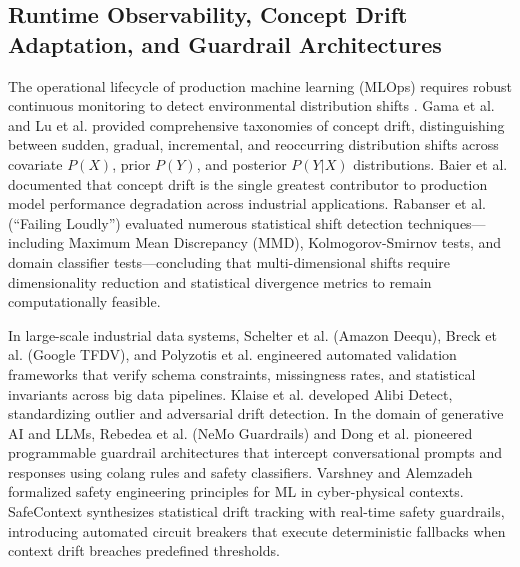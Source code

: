 \documentclass[journal]{IEEEtran}
\begin{document}
\subsection{Runtime Observability, Concept Drift Adaptation, and Guardrail Architectures}
The operational lifecycle of production machine learning (MLOps) requires robust continuous monitoring to detect environmental distribution shifts \cite{gama2014survey, lu2018learning, polyzotis2018data}. Gama et al. \cite{gama2014survey} and Lu et al. \cite{lu2018learning} provided comprehensive taxonomies of concept drift, distinguishing between sudden, gradual, incremental, and reoccurring distribution shifts across covariate $P(X)$, prior $P(Y)$, and posterior $P(Y|X)$ distributions. Baier et al. \cite{baier2019handling} documented that concept drift is the single greatest contributor to production model performance degradation across industrial applications. Rabanser et al. \cite{rabanser2019failing} (``Failing Loudly'') evaluated numerous statistical shift detection techniques---including Maximum Mean Discrepancy (MMD), Kolmogorov-Smirnov tests, and domain classifier tests---concluding that multi-dimensional shifts require dimensionality reduction and statistical divergence metrics to remain computationally feasible.

In large-scale industrial data systems, Schelter et al. \cite{schelter2018automating} (Amazon Deequ), Breck et al. \cite{breck2019data} (Google TFDV), and Polyzotis et al. \cite{polyzotis2018data} engineered automated validation frameworks that verify schema constraints, missingness rates, and statistical invariants across big data pipelines. Klaise et al. \cite{klaise2020alibi} developed Alibi Detect, standardizing outlier and adversarial drift detection. In the domain of generative AI and LLMs, Rebedea et al. \cite{rebedea2023nemo} (NeMo Guardrails) and Dong et al. \cite{dong2023guardrails} pioneered programmable guardrail architectures that intercept conversational prompts and responses using colang rules and safety classifiers. Varshney and Alemzadeh \cite{varshney2017safety} formalized safety engineering principles for ML in cyber-physical contexts. SafeContext synthesizes statistical drift tracking with real-time safety guardrails, introducing automated circuit breakers that execute deterministic fallbacks when context drift breaches predefined thresholds.
\end{document}
